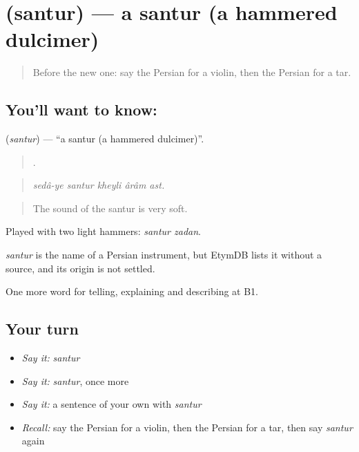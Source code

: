 \section[\texorpdfstring{\fa{سنتور} (santur)}{سنتور (santur)}]{ (santur) — a santur (a hammered dulcimer)}

\label{lesson:FA-C517-santur}



\begin{quote}
Before the new one: say the Persian for a violin, then the Persian for a tar.
\end{quote}

\subsection*{You'll want to know: }
\textbf{} (\emph{santur}) — \textquotedblleft{}a santur (a hammered dulcimer)\textquotedblright{}.

\begin{quote}
    .
\end{quote}

\begin{quote}
\emph{sedâ-ye santur kheyli ârâm ast.}
\end{quote}

\begin{quote}
The sound of the santur is very soft.
\end{quote}

Played with two light hammers: \emph{santur zadan}.

\begin{cousinweb}
\emph{santur} is the name of a Persian instrument, but EtymDB lists it without a source, and its origin is not settled.
\end{cousinweb}

\begin{grammarlens}[title={What you've built}]
One more word for telling, explaining and describing at B1.
\end{grammarlens}

\subsection*{Your turn}
\begin{itemize}
\raggedright
  \item \emph{Say it:} \emph{santur}
  \item \emph{Say it:} \emph{santur}, once more
  \item \emph{Say it:} a sentence of your own with \emph{santur}
  \item \emph{Recall:} say the Persian for a violin, then the Persian for a tar, then say \emph{santur} again
\end{itemize}

